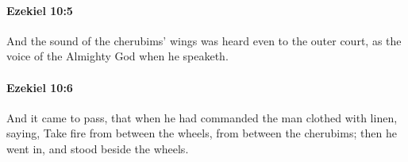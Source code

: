		\paragraph{Ezekiel 10:5} %
			\label{EZEKIEL-10-5}

			And the sound of the cherubims’ wings was heard even to the outer court, as the voice of the Almighty God when he speaketh.


		\paragraph{Ezekiel 10:6} %
			\label{EZEKIEL-10-6}

			And it came to pass, that when he had commanded the man clothed with linen, saying, Take fire from between the wheels, from between the cherubims; then he went in, and stood beside the wheels.


